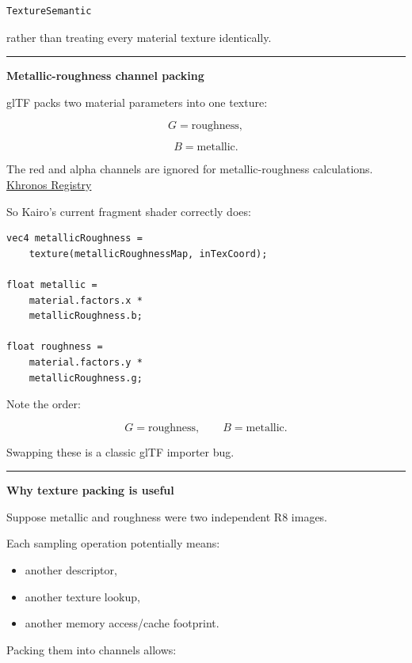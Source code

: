\begin{verbatim}
TextureSemantic
\end{verbatim}

rather than treating every material texture identically.

\begin{center}\rule{0.5\linewidth}{0.5pt}\end{center}

\textbf{Metallic-roughness channel packing}

glTF packs two material parameters into one texture:

\[
G=\text{roughness},
\]

\[
B=\text{metallic}.
\]

The red and alpha channels are ignored for metallic-roughness calculations. \href{https://registry.khronos.org/glTF/specs/2.0/glTF-2.0.html?utm_source=chatgpt.com}{Khronos Registry}

So Kairo's current fragment shader correctly does:

\begin{verbatim}
vec4 metallicRoughness =
    texture(metallicRoughnessMap, inTexCoord);

float metallic =
    material.factors.x *
    metallicRoughness.b;

float roughness =
    material.factors.y *
    metallicRoughness.g;
\end{verbatim}

Note the order:

\[
\boxed{
G=\text{roughness},\qquad B=\text{metallic}.
}
\]

Swapping these is a classic glTF importer bug.

\begin{center}\rule{0.5\linewidth}{0.5pt}\end{center}

\textbf{Why texture packing is useful}

Suppose metallic and roughness were two independent R8 images.

Each sampling operation potentially means:

\begin{itemize}
\tightlist
\item
  another descriptor,
\item
  another texture lookup,
\item
  another memory access/cache footprint.
\end{itemize}

Packing them into channels allows:

